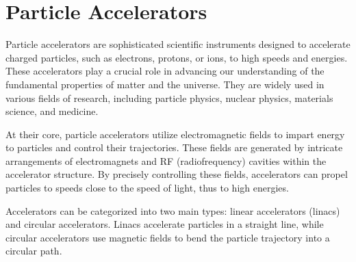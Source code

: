 \documentclass{article}
\begin{document}
\newcommand{\vecthreeBF}[1]{\vec{\textbf{#1}}}
\newcommand{\vecthree}[1]{\vec{#1}}

\newcommand{\parDeriv}[2]{\frac{\partial #1}{\partial #2}}
\newcommand{\parDerivS}[2]{\frac{\partial^2 #1}{\partial #2^2}}
\newcommand{\derivS}[2]{\frac{d^2 #1}{d#2^2}}

\newcommand{\dotProdBF}[2]{\vecthreeBF{#1} \cdot \vecthreeBF{#2}}
\newcommand{\dotProd}[2]{\vecthree{#1} \cdot \vecthree{#2}}

\newcommand{\crossProdBF}[2]{\vecthreeBF{#1} \times \vecthreeBF{#2}}
\newcommand{\crossProd}[2]{\vecthree{#1} \times \vecthree{#2}}


\newcommand{\fromeq}[1]{\textit{equation \ref{eq:#1}}}
\newcommand{\fromeqs}[2]{\textit{equations \ref{eq:#1} and \ref{eq:#2}}}

\newcommand{\fromfig}[1]{\textit{figure \ref{fig:#1}}}
\newcommand{\fromfigf}[4]{\textit{figures \ref{fig:#1}, \ref{fig:#2}, \ref{fig:#3} and \ref{fig:#4}}}

\newcommand{\fromsec}[1]{\textit{section \ref{sec:#1}}}



\section{Particle Accelerators}

Particle accelerators are sophisticated scientific instruments designed to accelerate charged particles, such as electrons, protons, or ions, to high speeds and energies. 
These accelerators play a crucial role in advancing our understanding of the fundamental properties of matter and the universe. 
They are widely used in various fields of research, including particle physics, nuclear physics, materials science, and medicine.

At their core, particle accelerators utilize electromagnetic fields to impart energy to particles and control their trajectories. 
These fields are generated by intricate arrangements of electromagnets and RF (radiofrequency) cavities within the accelerator structure. 
By precisely controlling these fields, accelerators can propel particles to speeds close to the speed of light, thus to high energies.

Accelerators can be categorized into two main types: linear accelerators (linacs) and circular accelerators. 
Linacs accelerate particles in a straight line, while circular accelerators use magnetic fields to bend the particle trajectory into a circular path. 
\end{document}
